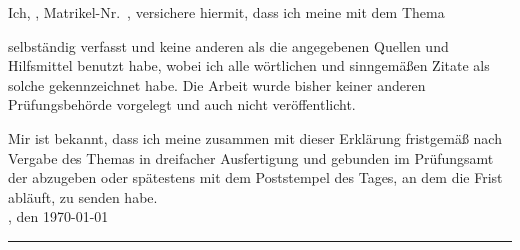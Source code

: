 
Ich, \autor, Matrikel-Nr.\ \matrikelnr, versichere hiermit, dass ich meine \art\xspace mit dem Thema
\begin{quote}
\textit{\titel} \textit{\untertitel}
\end{quote}
selbständig verfasst und keine anderen als die angegebenen Quellen und Hilfsmittel benutzt habe, wobei ich alle wörtlichen und sinngemäßen Zitate als solche gekennzeichnet habe. Die Arbeit wurde bisher keiner anderen Prüfungsbehörde vorgelegt und auch nicht veröffentlicht.

Mir ist bekannt, dass ich meine \art\xspace zusammen mit dieser Erklärung fristgemäß nach Vergabe des Themas in dreifacher Ausfertigung und gebunden im Prüfungsamt der \hochschule\xspace abzugeben oder spätestens mit dem Poststempel des Tages, an dem die Frist abläuft, zu senden habe.\\[6ex]

\ort, den \today


\rule[-0.2cm]{5cm}{0.5pt}

\textsc{\autor} 

